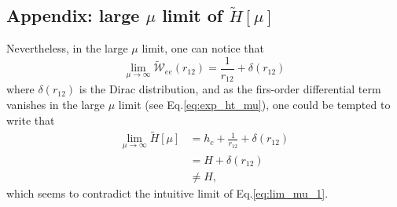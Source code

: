 \documentclass[aip,jcp,reprint,noshowkeys,superscriptaddress]{revtex4-1}
\begin{document}
\subsection{Appendix: large $\mu$ limit of $\tilde{H}[\mu]$}
\label{sec:large_mu_lim}
Nevertheless, in the large $\mu$ limit, one can notice that 
\begin{equation}
 \label{eq:lim_mu_3}
 \lim_{\mu \rightarrow \infty} \tilde{\mathcal{W}}_{ee}(r_{12})  = \frac{1}{r_{12}} + \delta(r_{12}) 
\end{equation}
where $\delta(r_{12})$ is the Dirac distribution, and as the firs-order differential term vanishes in the large $\mu$ limit (see Eq.\eqref{eq:exp_ht_mu}), one could be tempted to write that 
\begin{equation}
 \begin{aligned}
 \label{eq:lim_mu_4}
 \lim_{\mu \rightarrow \infty} \tilde{H}[\mu]& = h_c + \frac{1}{r_{12}} + \delta(r_{12}) \\
                                             & = H + \delta(r_{12})  \\
                                             & \ne H,
 \end{aligned}
\end{equation}
which seems to contradict the intuitive limit of Eq.\eqref{eq:lim_mu_1}. 
\end{document}
